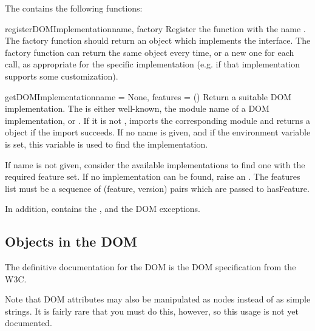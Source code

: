 The  contains the following functions:

\begin{funcdesc}{registerDOMImplementation}{name, factory}
Register the  function with the name .  The
factory function should return an object which implements the
 interface.  The factory function can return
the same object every time, or a new one for each call, as appropriate
for the specific implementation (e.g. if that implementation supports
some customization).
\end{funcdesc}

\begin{funcdesc}{getDOMImplementation}{name = None, features = ()}
Return a suitable DOM implementation. The  is either
well-known, the module name of a DOM implementation, or
. If it is not , imports the corresponding module and
returns a  object if the import succeeds.  If
no name is given, and if the environment variable  is
set, this variable is used to find the implementation.

If name is not given, consider the available implementations to find
one with the required feature set. If no implementation can be found,
raise an . The features list must be a sequence of
(feature, version) pairs which are passed to hasFeature.
\end{funcdesc}


In addition,  contains the , and the DOM
exceptions.

\subsection{Objects in the DOM \label{dom-objects}}

The definitive documentation for the DOM is the DOM specification from
the W3C.

Note that DOM attributes may also be manipulated as nodes instead of
as simple strings.  It is fairly rare that you must do this, however,
so this usage is not yet documented.


